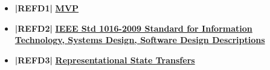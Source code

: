 \begin{itemize}
\item \textbf{|REFD1|} \href{https://en.wikipedia.org/wiki/Model–view–presenter}{\textbf{MVP}}

\item \textbf{|REFD2|} \href{https://standards.ieee.org/standard/1016-2009.html}{\textbf{IEEE Std 1016-2009 Standard for Information Technology, Systems Design, Software Design Descriptions}}

\item \textbf{|REFD3|} \href{https://it.wikipedia.org/wiki/Representational_State_Transfer}{\textbf{Representational State Transfers}}

\end{itemize}